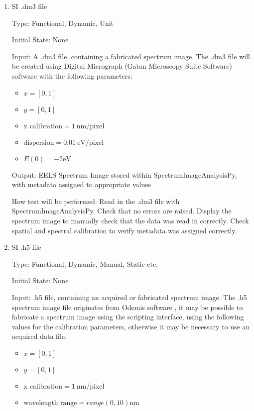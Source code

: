 \documentclass[12pt, titlepage]{article}
\newcommand{\progname}{SpectrumImageAnalysisPy}
\begin{document}
\begin{enumerate}
\item{SI .dm3 file}

Type: Functional, Dynamic, Unit

Initial State: None

Input: A .dm3 file, containing a fabricated spectrum image. The .dm3 file will be created using Digital Micrograph (Gatan Microscopy Suite Software) software \cite{noauthor_gatan_nodate} with the following parameters:
\begin{itemize}
	\item $x = [0, 1]$
	\item $y = [0, 1]$
	\item $\text{x calibration} = 1\ \si{\nano\metre}/\text{pixel}$
	\item $\text{dispersion} = 0.01\ \si{\electronvolt}/\text{pixel}$
	\item $E(0) = -2 \si{\electronvolt}$
\end{itemize}

Output: EELS Spectrum Image stored within \progname{}, with metadata assigned to appropriate values

How test will be performed: Read in the .dm3 file with \progname{}. Check that no errors are raised. Display the spectrum image to manually check that the data was read in correctly. Check spatial and spectral calibration to verify metadata was assigned correctly.


\item{SI .h5 file}

Type: Functional, Dynamic, Manual, Static etc.
					
Initial State: None
					
Input: .h5 file, containing an acquired or fabricated spectrum image. The .h5 spectrum image file originates from Odemis software \cite{bv_odemis:_nodate}, it may be possible to fabricate a spectrum image using the scripting interface, using the following values for the calibration parameters, otherwise it may be necessary to use an acquired data file.

\begin{itemize}
	\item $x = [0, 1]$
	\item $y = [0, 1]$
	\item $\text{x calibration} = 1\ \si{\nano\metre}/\text{pixel}$
	\item $\text{wavelength range} = range(0, 10) \si{\nano\metre}$
\end{itemize}
					

\end{enumerate}
\end{document}
